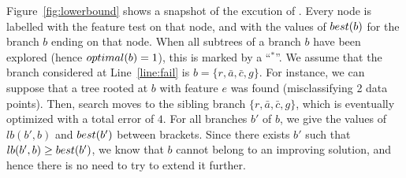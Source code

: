 \documentclass{llncs}
\newcommand{\lb}[1]{\ensuremath{lb({#1})}}
\newcommand{\best}[1][]{\ensuremath{\ifthenelse{\equal{#1}{}}{{best}}{{best({#1})}}}}
\newcommand{\opt}[1][]{\ensuremath{\ifthenelse{\equal{#1}{}}{optimal}{optimal({#1})}}}
\newcommand{\abranch}[0]{\ensuremath{b}}
\begin{document}
\begin{example}
	\label{ex:lb}
	
	Figure~\ref{fig:lowerbound} shows a snapshot of the excution of \budalg. Every node is labelled with the feature test on that node, and with the values of $\best[\abranch]$ for the branch $\abranch$ ending on that node. When all subtrees of a branch $\abranch$ have been explored (hence $\opt[\abranch]=1$), this is marked by a ``$^*$''. We assume that the branch considered at Line~\ref{line:fail} is $\abranch = \{r, \bar{a}, \bar{c}, g\}$. For instance, we can suppose that a tree rooted at $\abranch$ with feature $e$ was found (misclassifying 2 data points). Then, search moves to the sibling branch $\{r, \bar{a}, \bar{c}, g\}$, which is eventually optimized with a total error of $4$. For all branches $\abranch'$ of $\abranch$, we give the values of $\lb{\abranch',\abranch}$ and $\best[\abranch']$ between brackets. Since there exists $\abranch'$ such that $\lb{\abranch',\abranch} \geq \best[\abranch']$, we know that $\abranch$ cannot belong to an improving solution, and hence there is no need to try to extend it further. 
	



\end{example}
\end{document}
